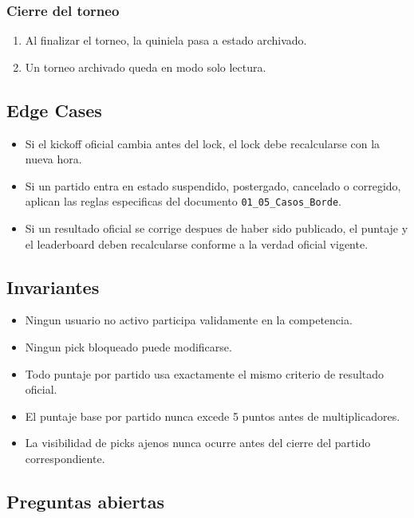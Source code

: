\subsubsection{Cierre del torneo}

\begin{enumerate}
  \item Al finalizar el torneo, la quiniela pasa a estado archivado.
  \item Un torneo archivado queda en modo solo lectura.
\end{enumerate}

\subsection{Edge Cases}

\begin{itemize}
  \item Si el kickoff oficial cambia antes del lock, el lock debe recalcularse con la nueva hora.
  \item Si un partido entra en estado suspendido, postergado, cancelado o corregido, aplican las reglas especificas del documento \texttt{01\_05\_Casos\_Borde}.
  \item Si un resultado oficial se corrige despues de haber sido publicado, el puntaje y el leaderboard deben recalcularse conforme a la verdad oficial vigente.
\end{itemize}

\subsection{Invariantes}

\begin{itemize}
  \item Ningun usuario no activo participa validamente en la competencia.
  \item Ningun pick bloqueado puede modificarse.
  \item Todo puntaje por partido usa exactamente el mismo criterio de resultado oficial.
  \item El puntaje base por partido nunca excede 5 puntos antes de multiplicadores.
  \item La visibilidad de picks ajenos nunca ocurre antes del cierre del partido correspondiente.
\end{itemize}

\subsection{Preguntas abiertas}

